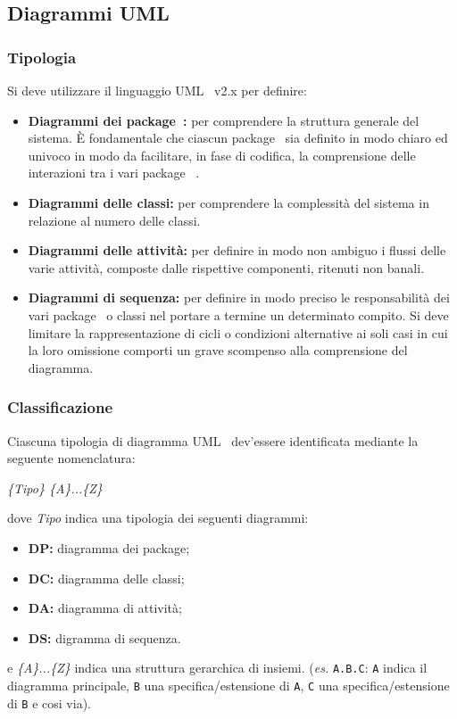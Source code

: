{{}

\subsection{Diagrammi UML}{
\subsubsection{Tipologia}{
Si deve utilizzare il linguaggio UML\g~ v2.x per definire:
\begin{itemize}
	\item [] \textbf{Diagrammi dei package\g~:} {per comprendere la struttura generale del sistema. \`E fondamentale che ciascun package\g~ sia definito in modo chiaro ed univoco in modo da facilitare, in fase di codifica, la comprensione delle interazioni tra i vari package\g~ .}
	\item [] \textbf{Diagrammi delle classi:} {per comprendere la complessità del sistema in relazione al numero delle classi.}
	\item [] \textbf{Diagrammi delle attività:} {per definire in modo non ambiguo i flussi delle varie attività, composte dalle rispettive componenti, ritenuti non banali.}
	\item [] \textbf{Diagrammi di sequenza:} {per definire in modo preciso le responsabilità dei vari package\g~ o classi nel portare a termine un determinato compito. Si deve limitare la rappresentazione di cicli o condizioni alternative ai soli casi in cui la loro omissione comporti un grave scompenso alla comprensione del diagramma.}
\end{itemize}
}%
\subsubsection{Classificazione}\label{classPCAS}{
Ciascuna tipologia di diagramma UML\g~ dev'essere identificata mediante la seguente nomenclatura:
\begin{center}
			\textit{\{Tipo\} \{A\}...\{Z\}}
		\end{center}dove \textit{Tipo} indica una tipologia dei seguenti diagrammi:
		\begin{itemize}
			\item [] \textbf{DP:} diagramma dei package\g ;
			\item [] \textbf{DC:} diagramma delle classi;
			\item [] \textbf{DA:} diagramma di attività;
			\item [] \textbf{DS:} digramma di sequenza.
		\end{itemize}e \textit{\{A\}...\{Z\}} indica una struttura gerarchica di insiemi. (\textit{es.} \texttt{A.B.C}: \texttt{A} indica il diagramma principale, \texttt{B} una specifica/estensione di \texttt{A}, \texttt{C} una specifica/estensione di \texttt{B} e cosi via). \\
}%

}}
